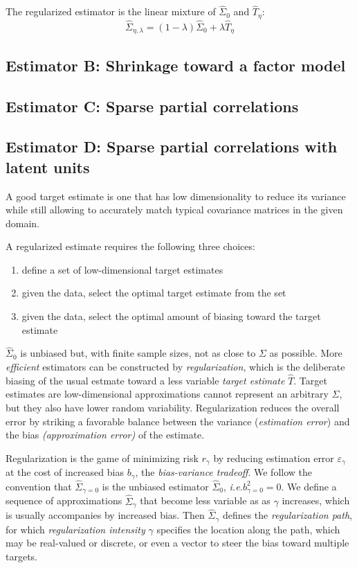 The regularized estimator is the linear mixture of $\hat\Sigma_0$ and $\hat T_\eta$:
\begin{equation}
\hat\Sigma_{\eta,\lambda} = (1-\lambda)\hat\Sigma_0 + \lambda \hat T_\eta 
\end{equation}


\subsection{Estimator B: Shrinkage toward a factor model}

\subsection{Estimator C: Sparse partial correlations}

\subsection{Estimator D: Sparse partial correlations with latent units}





A good target estimate is one that has low dimensionality to reduce its variance while still allowing to accurately match typical covariance matrices in the given domain. 

A regularized estimate requires the following three choices: 
\begin{enumerate}[  1. ]
\item define a set of low-dimensional target estimates
\item given the data, select the optimal target estimate from the set 
\item given the data, select the optimal amount of biasing toward the target estimate
\end{enumerate}

$\hat\Sigma_0$ is unbiased but, with finite sample sizes, not as close to $\Sigma$ as possible.  More \emph{efficient} estimators can be constructed by \emph{regularization}, which is the deliberate biasing of the usual estmate toward a less variable \emph{target estimate} $\hat T$. Target estimates are low-dimensional approximations cannot represent an arbitrary $\Sigma$, but they also have lower random variability.
Regularization reduces the overall error by striking a favorable balance between the variance  (\emph{estimation error}) and the bias \emph{(approximation error)} of the estimate.  


Regularization is the game of minimizing risk $r_\gamma$ by reducing estimation error $\varepsilon_\gamma$ at the cost of increased bias $b_\gamma$, the \emph{bias-variance tradeoff}.  
We follow the convention that $\hat\Sigma_{\gamma=0}$ is the unbiased estimator $\hat\Sigma_0$, \emph{i.e.}\;$b_{\gamma=0}^2 = 0$. 
We define a sequence of approximations $\hat\Sigma_\gamma$ that become less variable as as $\gamma$ increases, which is usually accompanies by increased bias. Then $\hat\Sigma_\gamma$ defines the \emph{regularization path}, for which \emph{regularization intensity} $\gamma$ specifies the location along the path, which may be real-valued or discrete, or even a vector to steer the bias toward multiple targets.  

